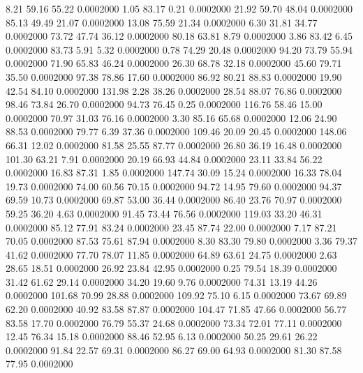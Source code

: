    8.21   59.16   55.22   0.0002000
   1.05   83.17    0.21   0.0002000
  21.92   59.70   48.04   0.0002000
  85.13   49.49   21.07   0.0002000
  13.08   75.59   21.34   0.0002000
   6.30   31.81   34.77   0.0002000
  73.72   47.74   36.12   0.0002000
  80.18   63.81    8.79   0.0002000
   3.86   83.42    6.45   0.0002000
  83.73    5.91    5.32   0.0002000
   0.78   74.29   20.48   0.0002000
  94.20   73.79   55.94   0.0002000
  71.90   65.83   46.24   0.0002000
  26.30   68.78   32.18   0.0002000
  45.60   79.71   35.50   0.0002000
  97.38   78.86   17.60   0.0002000
  86.92   80.21   88.83   0.0002000
  19.90   42.54   84.10   0.0002000
 131.98    2.28   38.26   0.0002000
  28.54   88.07   76.86   0.0002000
  98.46   73.84   26.70   0.0002000
  94.73   76.45    0.25   0.0002000
 116.76   58.46   15.00   0.0002000
  70.97   31.03   76.16   0.0002000
   3.30   85.16   65.68   0.0002000
  12.06   24.90   88.53   0.0002000
  79.77    6.39   37.36   0.0002000
 109.46   20.09   20.45   0.0002000
 148.06   66.31   12.02   0.0002000
  81.58   25.55   87.77   0.0002000
  26.80   36.19   16.48   0.0002000
 101.30   63.21    7.91   0.0002000
  20.19   66.93   44.84   0.0002000
  23.11   33.84   56.22   0.0002000
  16.83   87.31    1.85   0.0002000
 147.74   30.09   15.24   0.0002000
  16.33   78.04   19.73   0.0002000
  74.00   60.56   70.15   0.0002000
  94.72   14.95   79.60   0.0002000
  94.37   69.59   10.73   0.0002000
  69.87   53.00   36.44   0.0002000
  86.40   23.76   70.97   0.0002000
  59.25   36.20    4.63   0.0002000
  91.45   73.44   76.56   0.0002000
 119.03   33.20   46.31   0.0002000
  85.12   77.91   83.24   0.0002000
  23.45   87.74   22.00   0.0002000
   7.17   87.21   70.05   0.0002000
  87.53   75.61   87.94   0.0002000
   8.30   83.30   79.80   0.0002000
   3.36   79.37   41.62   0.0002000
  77.70   78.07   11.85   0.0002000
  64.89   63.61   24.75   0.0002000
   2.63   28.65   18.51   0.0002000
  26.92   23.84   42.95   0.0002000
   0.25   79.54   18.39   0.0002000
  31.42   61.62   29.14   0.0002000
  34.20   19.60    9.76   0.0002000
  74.31   13.19   44.26   0.0002000
 101.68   70.99   28.88   0.0002000
 109.92   75.10    6.15   0.0002000
  73.67   69.89   62.20   0.0002000
  40.92   83.58   87.87   0.0002000
 104.47   71.85   47.66   0.0002000
  56.77   83.58   17.70   0.0002000
  76.79   55.37   24.68   0.0002000
  73.34   72.01   77.11   0.0002000
  12.45   76.34   15.18   0.0002000
  88.46   52.95    6.13   0.0002000
  50.25   29.61   26.22   0.0002000
  91.84   22.57   69.31   0.0002000
  86.27   69.00   64.93   0.0002000
  81.30   87.58   77.95   0.0002000
